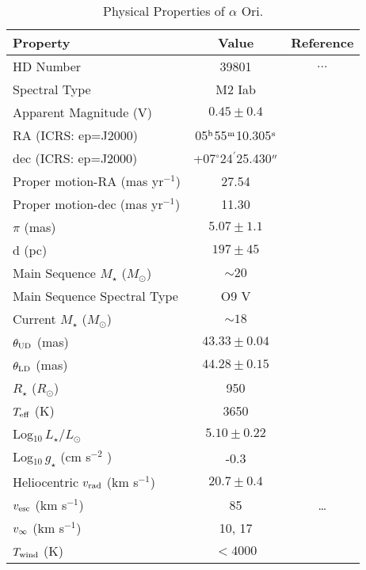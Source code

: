 \begin{table}[!hbt]
\begin{center}
\caption[Physical Properties of $\alpha$ Ori.]
{Physical Properties of $\alpha$ Ori.}
\begin{tabular}{lcc}
\hline
\hline
\rule{0pt}{2.5ex}Property & Value & Reference \\
\hline
\rule{0pt}{2.5ex}HD Number & 39801 & $\ldots$\\
Spectral Type & M2 Iab & \cite{perryman_1997} \\ 
Apparent Magnitude (V) & $0.45\pm0.4$ & \cite{perryman_1997}\\
RA (ICRS: ep=J2000)& 05$^{\rm{h}}$55$^{\rm{m}}$10.305$^{\rm{s}}$ & \cite{van_leeuwen_2007}\\
dec (ICRS: ep=J2000) & +07$^{\circ}$24$^{\prime}$25.430$^{\prime\prime}$& \cite{van_leeuwen_2007}\\
Proper motion-RA (mas yr$^{-1}$)& 27.54 & \cite{van_leeuwen_2007}\\
Proper motion-dec (mas yr$^{-1}$)& 11.30 & \cite{van_leeuwen_2007}\\
$\pi$ (mas)& $5.07\pm1.1$ &\cite{harper_2008}\\
d (pc)& $197\pm45$ & \cite{harper_2008}\\
Main Sequence $M_{\star}$ ($M_{\odot}$) & $\sim 20$ & \cite{meynet_2003}\\
Main Sequence Spectral Type & O9 V & \cite{harper_2008}\\
Current $M_{\star}$ ($M_{\odot}$) & $\sim 18$ & \cite{meynet_2003}\\
$\theta _{\rm{UD}}$ (mas)& $43.33 \pm 0.04$ & \cite{perrin_2004}\\
$\theta _{\rm{LD}}$ (mas)& $44.28 \pm 0.15$ & \cite{haubois_2009}\\
$R_{\star}$ ($R_{\odot}$)& 950 & \cite{harper_2008} \\
$T_{\rm{eff}}$ (K)& 3650 & \cite{levesque_2005}\\
Log$_{10}\,L_{\star}/L_{\odot}$& $5.10\pm0.22$  & \cite{harper_2008}\\
Log$_{10}\,g_{\star}$ (cm s$^{-2}$ )& -0.3 & \cite{meynet_2003} \\
Heliocentric $v_{\rm{rad}}$ (km s$^{-1}$) & $20.7\pm0.4 $& \cite{harper_2008} \\
$v_{\rm{esc}}$ (km s$^{-1}$) & 85 & \dots\\
$v_{\rm{\infty}}$ (km s$^{-1}$)& 10, 17 & \cite{bernat_1979} \\
$T_{\rm{wind}}$ (K)& $< 4000$ & \cite{lim_1998} \\

\end{tabular}
\end{center}
\end{table}
